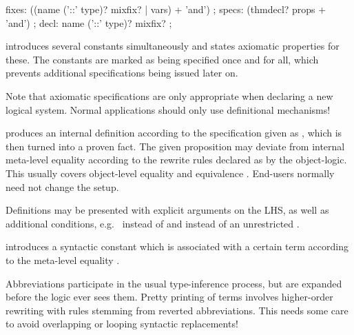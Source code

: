 \begin{isabellebody}
\begin{isamarkuptext}
\begin{rail}
    fixes: ((name ('::' type)? mixfix? | vars) + 'and')
    ;
    specs: (thmdecl? props + 'and')
    ;
    decl: name ('::' type)? mixfix?
    ;
  \end{rail}

  \begin{descr}
  
  \item [\mbox{\isa{\isacommand{axiomatization}}}~\isa{c\isactrlsub {\isadigit{1}}\ {\isasymdots}\ c\isactrlsub m\ {\isasymWHERE}\ {\isasymphi}\isactrlsub {\isadigit{1}}\ {\isasymdots}\ {\isasymphi}\isactrlsub n}] introduces several constants
  simultaneously and states axiomatic properties for these.  The
  constants are marked as being specified once and for all, which
  prevents additional specifications being issued later on.
  
  Note that axiomatic specifications are only appropriate when
  declaring a new logical system.  Normal applications should only use
  definitional mechanisms!

  \item [\mbox{\isa{\isacommand{definition}}}~\isa{c\ {\isasymWHERE}\ eq}] produces an
  internal definition  according to the specification
  given as , which is then turned into a proven fact.  The
  given proposition may deviate from internal meta-level equality
  according to the rewrite rules declared as \mbox{} by the
  object-logic.  This usually covers object-level equality  and equivalence .  End-users normally need not
  change the \mbox{} setup.
  
  Definitions may be presented with explicit arguments on the LHS, as
  well as additional conditions, e.g.\  instead of
   and  instead of an
  unrestricted .
  
  \item [\mbox{\isa{\isacommand{abbreviation}}}~\isa{c\ {\isasymWHERE}\ eq}] introduces
  a syntactic constant which is associated with a certain term
  according to the meta-level equality .
  
  Abbreviations participate in the usual type-inference process, but
  are expanded before the logic ever sees them.  Pretty printing of
  terms involves higher-order rewriting with rules stemming from
  reverted abbreviations.  This needs some care to avoid overlapping
  or looping syntactic replacements!
  

\end{descr}
\end{isamarkuptext}
\end{isabellebody}
